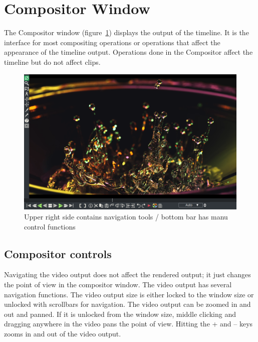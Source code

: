 \section{Compositor Window}%
\label{sec:compositor_window}

The Compositor window (figure~\ref{fig:compositor_window}) displays the output of the timeline. 
It is the interface for most compositing operations or operations that affect the appearance of the timeline output. 
Operations done in the Compositor affect the timeline but do not affect clips.

\begin{figure}[htpb]
    \centering
    \includegraphics[width=0.99\linewidth]{images/compositor_window.png}
    \caption{Upper right side contains navigation tools / bottom bar has manu control functions}
    \label{fig:compositor_window}
\end{figure}

\subsection{Compositor controls}%
\label{sub:compositor_controls}


Navigating the video output does not affect the rendered output; it just changes the point of view in the compositor window. 
The video output has several navigation functions. 
The video output size is either locked to the window size or unlocked with scrollbars for navigation. 
The video output can be zoomed in and out and panned. 
If it is unlocked from the window size, middle clicking and dragging anywhere in the video pans the point of view. Hitting the + and -- keys zooms in and out of the video output.

